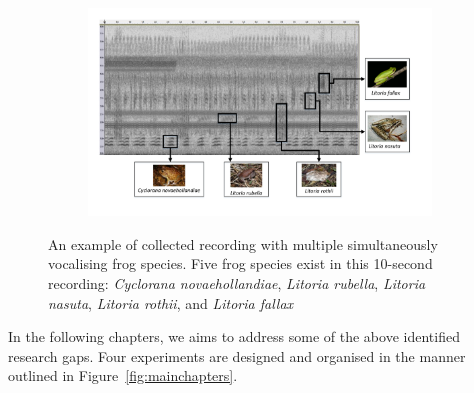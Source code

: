 \begin{figure}[htb!]
\centering
    \begin{subfigure}[b]{\textwidth}
           \includegraphics[width=1\textwidth]{image/LR/label.pdf}
    \end{subfigure}%
\caption[An example of collected recording]{An example of collected recording with multiple simultaneously vocalising frog species. Five frog species exist in this 10-second recording: \textit{Cyclorana novaehollandiae}, \textit{Litoria rubella}, \textit{Litoria nasuta}, \textit{Litoria rothii}, and \textit{Litoria fallax}}
\label{fig:label}       
\end{figure}


In the following chapters, we aims to address some of the above identified research gaps. Four experiments are designed and organised in the manner outlined in Figure~\ref{fig:mainchapters}.



